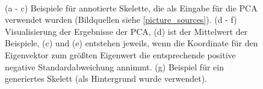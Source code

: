 \begin{figure}
  \\
  
  \caption{(a - c) Beispiele für annotierte Skelette, die als Eingabe für die PCA verwendet wurden (Bildquellen siehe \ref{picture_sources}). (d - f) Visualisierung der Ergebnisse der PCA, (d) ist der Mittelwert der Beispiele, (c) und (e) entstehen jeweils, wenn die Koordinate für den Eigenvektor zum größten Eigenwert die entsprechende positive \bzw negative Standardabweichung annimmt. (g) Beispiel für ein generiertes Skelett (als Hintergrund wurde \cite{background} verwendet).}
  \label{intro_pic}
 \end{figure}
